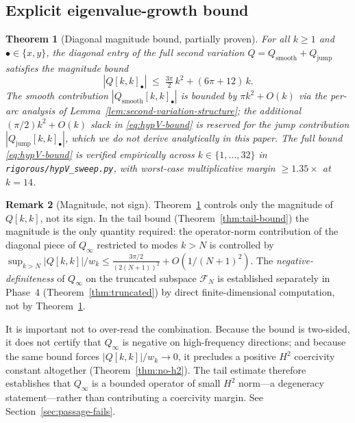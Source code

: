 \documentclass[11pt]{amsart}
\theoremstyle{plain}
\newtheorem{theorem}{Theorem}
\theoremstyle{definition}
\newtheorem{remark}[theorem]{Remark}
\begin{document}
\subsection{Explicit eigenvalue-growth bound}

\begin{theorem}[Diagonal magnitude bound, partially proven]\label{thm:hypV}
For all $k \geq 1$ and $\bullet \in \{x, y\}$, the diagonal entry
of the full second variation $Q = Q_{\mathrm{smooth}} +
Q_{\mathrm{jump}}$ satisfies the magnitude bound
\begin{equation}\label{eq:hypV-bound}
   |Q[k, k]_{\bullet}| \;\leq\; \tfrac{3\pi}{2} \, k^{2}
                                + (6\pi + 12) \, k.
\end{equation}
The smooth contribution
$|Q_{\mathrm{smooth}}[k,k]_{\bullet}|$ is bounded by $\pi k^{2} +
O(k)$ via the per-arc analysis of
Lemma~\ref{lem:second-variation-structure}; the additional
$(\pi/2)k^{2} + O(k)$ slack in \eqref{eq:hypV-bound} is reserved
for the jump contribution $|Q_{\mathrm{jump}}[k,k]_{\bullet}|$,
which we do not derive analytically in this paper.  The full
bound \eqref{eq:hypV-bound} is verified empirically across
$k \in \{1, \ldots, 32\}$ in
\texttt{rigorous/hypV\_sweep.py}, with worst-case multiplicative
margin $\geq 1.35\times$ at $k = 14$.
\end{theorem}

\begin{remark}[Magnitude, not sign]\label{rem:tail-magnitude}
Theorem~\ref{thm:hypV} controls only the magnitude of $Q[k,k]$,
not its sign.  In the tail bound
(Theorem~\ref{thm:tail-bound}) the magnitude is the only quantity
required: the operator-norm contribution of the diagonal piece of
$Q_{\infty}$ restricted to modes $k > N$ is controlled by
$\sup_{k > N}|Q[k,k]| / w_{k} \leq \tfrac{3\pi/2}{(2(N+1))^{2}} +
O(1/(N+1)^{2})$.  The \emph{negative-definiteness} of $Q_{\infty}$
on the truncated subspace $\mathcal{F}_{N}$ is established
separately in Phase~4 (Theorem~\ref{thm:truncated}) by direct
finite-dimensional computation, not by Theorem~\ref{thm:hypV}.

It is important not to over-read the combination.  Because the bound
is two-sided, it does not certify that $Q_{\infty}$ is negative on
high-frequency directions; and because the same bound forces
$|Q[k,k]|/w_{k} \to 0$, it precludes a positive $H^{2}$ coercivity
constant altogether (Theorem~\ref{thm:no-h2}).  The tail estimate
therefore establishes that $Q_{\infty}$ is a bounded operator of small
$H^{2}$ norm---a degeneracy statement---rather than contributing a
coercivity margin.  See Section~\ref{sec:passage-fails}.
\end{remark}
\end{document}
